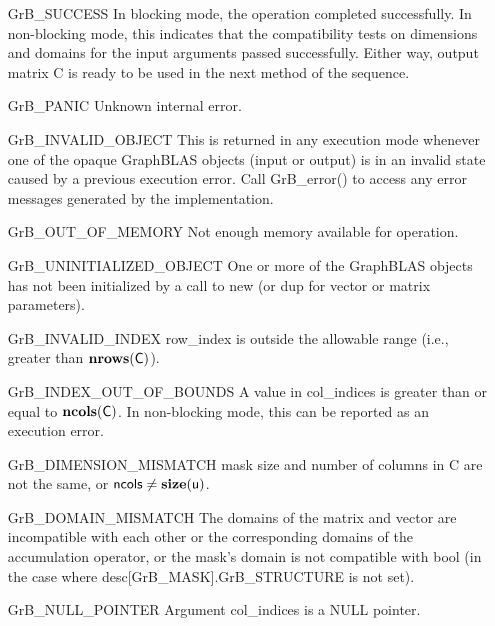 \begin{itemize}[leftmargin=2.3in]
    \item[{\sf GrB\_SUCCESS}]         In blocking mode, the operation completed
    successfully. In non-blocking mode, this indicates that the compatibility 
    tests on dimensions and domains for the input arguments passed successfully. 
    Either way, output matrix {\sf C} is ready to be used in the next method of 
    the sequence.

    \item[{\sf GrB\_PANIC}]           Unknown internal error.

    \item[{\sf GrB\_INVALID\_OBJECT}] This is returned in any execution mode 
    whenever one of the opaque GraphBLAS objects (input or output) is in an invalid 
    state caused by a previous execution error.  Call {\sf GrB\_error()} to access 
    any error messages generated by the implementation.

    \item[{\sf GrB\_OUT\_OF\_MEMORY}] Not enough memory available for operation.

    \item[{\sf GrB\_UNINITIALIZED\_OBJECT}] One or more of the GraphBLAS objects
    has not been initialized by a call to {\sf new} (or {\sf dup} for vector or
    matrix parameters).

    \item[{\sf GrB\_INVALID\_INDEX}]    {\sf row\_index} is outside the allowable 
    range (i.e., greater than $\bold{nrows}({\sf C})$).

    \item[{\sf GrB\_INDEX\_OUT\_OF\_BOUNDS}]  A value in {\sf col\_indices} 
    is greater than or equal to $\bold{ncols}({\sf C})$.  In 
    non-blocking mode, this can be reported as an execution error.

    \item[{\sf GrB\_DIMENSION\_MISMATCH}] {\sf mask} size and number of columns
    in {\sf C} are not the same, or ${\sf ncols} \neq \bold{size}({\sf u})$.

    \item[{\sf GrB\_DOMAIN\_MISMATCH}]    The domains of the matrix and vector are
    incompatible with each other or the corresponding domains of the
    accumulation operator, or the mask's domain is not compatible with {\sf bool}
    (in the case where {\sf desc[GrB\_MASK].GrB\_STRUCTURE} is not set).

    \item[{\sf GrB\_NULL\_POINTER}] Argument {\sf col\_indices} is a {\sf NULL} pointer.
\end{itemize}

